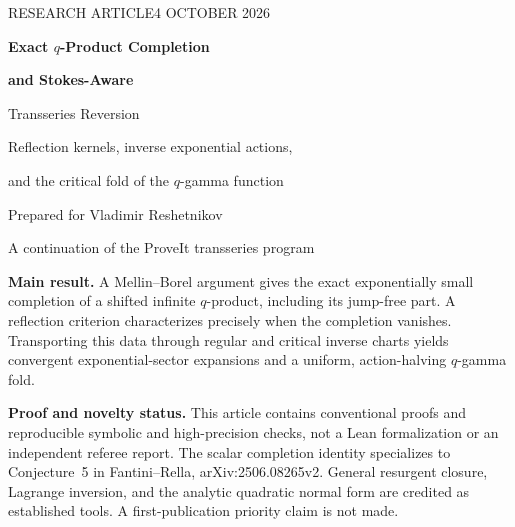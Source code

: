 \documentclass[11pt,a4paper]{article}
\numberwithin{equation}{section}
\theoremstyle{definition}
\theoremstyle{remark}
\begin{document}
\hypersetup{pageanchor=false}
\begin{titlepage}
\thispagestyle{empty}
\vspace*{10mm}
{\sffamily\small RESEARCH ARTICLE\hfill 4 OCTOBER 2026\par}
\vspace{19mm}
{\Huge\bfseries Exact $q$-Product Completion\par}
\vspace{4mm}
{\LARGE\bfseries and Stokes-Aware\par Transseries Reversion\par}
\vspace{10mm}
{\Large Reflection kernels, inverse exponential actions,\par
and the critical fold of the $q$-gamma function\par}
\vspace{15mm}
{\large Prepared for Vladimir Reshetnikov\par}
{\normalsize A continuation of the ProveIt transseries program\par}
\vspace{14mm}
\begin{tcolorbox}[colback=blue!3,colframe=blue!35!black,boxrule=.5pt,arc=1mm]
\textbf{Main result.} A Mellin--Borel argument gives the exact exponentially small completion of a shifted infinite $q$-product, including its jump-free part. A reflection criterion characterizes precisely when the completion vanishes. Transporting this data through regular and critical inverse charts yields convergent exponential-sector expansions and a uniform, action-halving $q$-gamma fold.
\end{tcolorbox}
\vfill
\noindent\textbf{Proof and novelty status.} This article contains conventional proofs and reproducible symbolic and high-precision checks, not a Lean formalization or an independent referee report. The scalar completion identity specializes to Conjecture~5 in Fantini--Rella, arXiv:2506.08265v2. General resurgent closure, Lagrange inversion, and the analytic quadratic normal form are credited as established tools. A first-publication priority claim is not made.
\end{titlepage}
\hypersetup{pageanchor=true}
\end{document}
